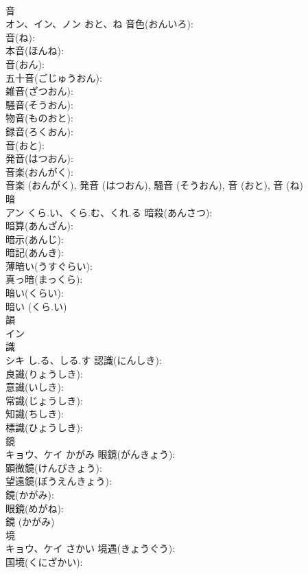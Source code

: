 \documentclass[8pt]{extreport}
\begin{document}
\begin{CJK}{UTF8}{min}
\\	音		
\\	オン、イン、ノン	おと、ね	音色(おんいろ): 
\\	音(ね): 
\\	本音(ほんね): 
\\	音(おん): 
\\	五十音(ごじゅうおん): 
\\	雑音(ざつおん): 
\\	騒音(そうおん): 
\\	物音(ものおと): 
\\	録音(ろくおん): 
\\	音(おと): 
\\	発音(はつおん): 
\\	音楽(おんがく): 
\\	音楽 (おんがく), 発音 (はつおん), 騒音 (そうおん), 音 (おと), 音 (ね)
\\	暗			
\\	アン	くら.い、くら.む、くれ.る	暗殺(あんさつ): 
\\	暗算(あんざん): 
\\	暗示(あんじ): 
\\	暗記(あんき): 
\\	薄暗い(うすぐらい): 
\\	真っ暗(まっくら): 
\\	暗い(くらい): 
\\	暗い (くら.い)
\\	韻		
\\	イン			
\\	識			
\\	シキ	し.る、しる.す	認識(にんしき): 
\\	良識(りょうしき): 
\\	意識(いしき): 
\\	常識(じょうしき): 
\\	知識(ちしき): 
\\	標識(ひょうしき): 
\\	鏡			
\\	キョウ、ケイ	かがみ	眼鏡(がんきょう): 
\\	顕微鏡(けんびきょう): 
\\	望遠鏡(ぼうえんきょう): 
\\	鏡(かがみ): 
\\	眼鏡(めがね): 
\\	鏡 (かがみ)
\\	境			
\\	キョウ、ケイ	さかい	境遇(きょうぐう): 
\\	国境(くにざかい): 

\end{CJK}
\end{document}
